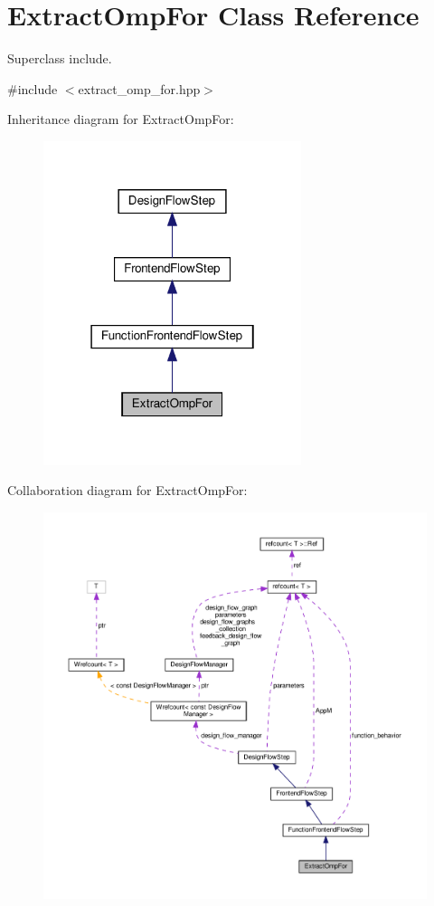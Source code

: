 \hypertarget{classExtractOmpFor}{}\section{Extract\+Omp\+For Class Reference}
\label{classExtractOmpFor}


Superclass include.  




{\ttfamily \#include $<$extract\+\_\+omp\+\_\+for.\+hpp$>$}



Inheritance diagram for Extract\+Omp\+For\+:
\nopagebreak
\begin{figure}[H]
\begin{center}
\leavevmode
\includegraphics[width=214pt]{d7/d99/classExtractOmpFor__inherit__graph}
\end{center}
\end{figure}


Collaboration diagram for Extract\+Omp\+For\+:
\nopagebreak
\begin{figure}[H]
\begin{center}
\leavevmode
\includegraphics[width=350pt]{d6/ddb/classExtractOmpFor__coll__graph}
\end{center}
\end{figure}
